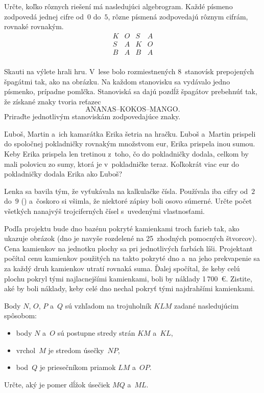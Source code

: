 {%
Určte, koľko rôznych riešení má nasledujúci algebrogram.
Každé písmeno zodpovedá jednej cifre od~$0$ do~$5$,
rôzne písmená zodpovedajú rôznym cifrám, rovnaké rovnakým.
$$
\begin{array}{cccc}
K & O & S & A \\
S & A & K & O \\
\hline
B & A & B & A \\
\end{array}
$$
}

{%
Skauti na výlete hrali hru. V~lese bolo rozmiestnených 8~stanovísk prepojených špagátmi tak,
ako na obrázku.
Na každom stanovisku sa vydávalo jedno písmenko, prípadne pomlčka.
Stanoviská sa dajú pozdĺž špagátov prebehnúť tak, že získané
znaky tvoria reťazec
$$
\text{ANANAS--KOKOS--MANGO}.
$$
Priraďte jednotlivým stanoviskám zodpovedajúce znaky.
%
}

{%
Ľuboš, Martin a~ich kamarátka Erika šetria na hračku.
Ľuboš a~Martin prispeli do spoločnej pokladničky rovnakým množstvom eur,
Erika prispela inou sumou.
Keby Erika prispela len tretinou z~toho, čo do pokladničky dodala, celkom
by mali polovicu zo sumy, ktorá je v~pokladničke teraz.
Koľkokrát viac eur do pokladničky dodala Erika ako Ľuboš?}

{%
Lenka sa bavila tým, že vyťukávala na kalkulačke čísla.
Používala iba cifry od~$2$ do~$9$ (\obr) a~čoskoro si všimla, že niektoré zápisy boli
osovo súmerné.
Určte počet všetkých nanajvýš trojciferných čísel s~uvedenými vlastnosťami.
%
}

{%
Podľa projektu bude dno bazénu pokryté kamienkami troch farieb tak, ako ukazuje
obrázok (dno je navyše rozdelené na 25~zhodných pomocných štvorcov).
Cena kamienkov
na jednotku plochy sa pri jednotlivých farbách líši. Projektant počítal cenu
kamienkov použitých na takto pokryté dno a~na jeho prekvapenie sa za každý
druh kamienkov utratí rovnaká suma. Ďalej spočítal, že keby celú plochu
pokryl tými najlacnejšími kamienkami, boli by náklady 1\,700~€.
Zistite, aké by boli náklady, keby celé dno nechal pokryť tými
najdrahšími kamienkami.
%
}

{%
Body $N$, $O$, $P$ a~$Q$ sú vzhľadom na trojuholník $KLM$ zadané nasledujúcim
spôsobom:
\begin{itemize}
\item body $N$ a~$O$ sú postupne stredy strán $KM$ a~$KL$,
\item vrchol~$M$ je stredom úsečky~$NP$,
\item bod~$Q$ je priesečníkom priamok $LM$ a~$OP$.
\end{itemize}
\noindent
Určte, aký je pomer dĺžok úsečiek $MQ$ a~$ML$.}

